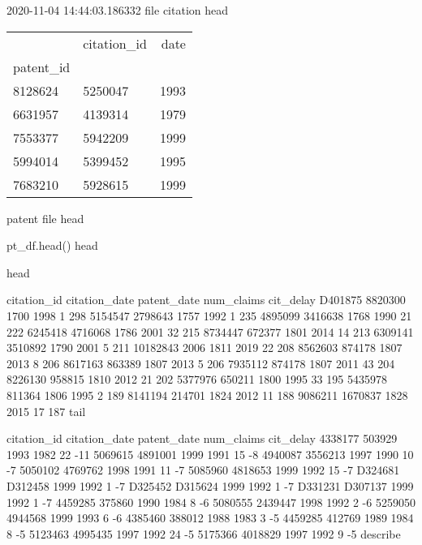 2020-11-04 14:44:03.186332
file citation head 

\begin{tabular}{llr}
\toprule
{} & citation\_id &  date \\
patent\_id &             &       \\
\midrule
8128624   &     5250047 &  1993 \\
6631957   &     4139314 &  1979 \\
7553377   &     5942209 &  1999 \\
5994014   &     5399452 &  1995 \\
7683210   &     5928615 &  1999 \\
\bottomrule
\end{tabular}

patent file head 

pt_df.head()
head

head

         citation_id  citation_date  patent_date  num_claims  cit_delay
D401875      8820300           1700         1998           1        298
5154547      2798643           1757         1992           1        235
4895099      3416638           1768         1990          21        222
6245418      4716068           1786         2001          32        215
8734447       672377           1801         2014          14        213
6309141      3510892           1790         2001           5        211
10182843        2006           1811         2019          22        208
8562603       874178           1807         2013           8        206
8617163       863389           1807         2013           5        206
7935112       874178           1807         2011          43        204
8226130       958815           1810         2012          21        202
5377976       650211           1800         1995          33        195
5435978       811364           1806         1995           2        189
8141194       214701           1824         2012          11        188
9086211      1670837           1828         2015          17        187
tail 

        citation_id  citation_date  patent_date  num_claims  cit_delay
4338177      503929           1993         1982          22        -11
5069615     4891001           1999         1991          15         -8
4940087     3556213           1997         1990          10         -7
5050102     4769762           1998         1991          11         -7
5085960     4818653           1999         1992          15         -7
D324681     D312458           1999         1992           1         -7
D325452     D315624           1999         1992           1         -7
D331231     D307137           1999         1992           1         -7
4459285      375860           1990         1984           8         -6
5080555     2439447           1998         1992           2         -6
5259050     4944568           1999         1993           6         -6
4385460      388012           1988         1983           3         -5
4459285      412769           1989         1984           8         -5
5123463     4995435           1997         1992          24         -5
5175366     4018829           1997         1992           9         -5
describe

